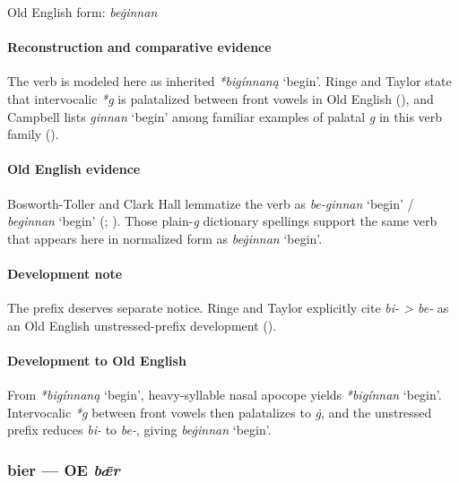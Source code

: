 \documentclass[
  british,
  a4paper,
]{article}
\providecommand{\Recon}[1]{\emph{*#1}}
\begin{document}
Old English form: \emph{beġinnan}

\paragraph{Reconstruction and comparative
evidence}\label{reconstruction-and-comparative-evidence-3}

The verb is modeled here as inherited \Recon{bigínnaną} `begin'. Ringe
and Taylor state that intervocalic \emph{*g} is palatalized between
front vowels in Old English (), and Campbell lists {\emph{ginnan}} `begin' among familiar
examples of palatal \emph{g} in this verb family
().

\paragraph{Old English evidence}\label{old-english-evidence-3}

Bosworth-Toller and Clark Hall lemmatize the verb as {\emph{be-ginnan}}
`begin' / {\emph{beginnan}} `begin'
(;
). Those plain-\emph{g}
dictionary spellings support the same verb that appears here in
normalized form as {\emph{beġinnan}} `begin'.

\paragraph{Development note}\label{development-note}

The prefix deserves separate notice. Ringe and Taylor explicitly cite
\emph{bi- \textgreater{} be-} as an Old English unstressed-prefix
development ().

\paragraph{Development to Old
English}\label{development-to-old-english-3}

From \Recon{bigínnaną} `begin', heavy-syllable nasal apocope yields
\Recon{bigínnan} `begin'. Intervocalic \emph{*g} between front vowels
then palatalizes to \emph{ġ}, and the unstressed prefix reduces
\emph{bi-} to \emph{be-}, giving {\emph{beġinnan}} `begin'.

\subsubsection{\texorpdfstring{bier --- OE
\emph{bǣr}}{bier --- OE bǣr}}\label{bier-oe-bux1e3r}
\end{document}
